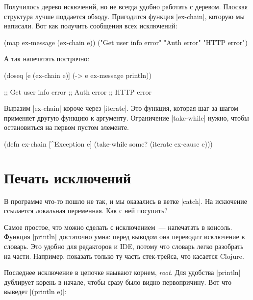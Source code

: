 Получилось дерево искючений, но не всегда удобно работать с деревом. Плоская
структура лучше поддается обходу. Пригодится функция \spverb|ex-chain|, которую
мы написали. Вот как получить сообщения всех исключений:

\begin{english}
  \begin{clojure}
(map ex-message (ex-chain e))
("Get user info error" "Auth error" "HTTP error")
  \end{clojure}
\end{english}

\noindent
А так напечатать построчно:

\begin{english}
  \begin{clojure}
(doseq [e (ex-chain e)]
  (-> e ex-message println))

;; Get user info error
;; Auth error
;; HTTP error
  \end{clojure}
\end{english}

Выразим \spverb|ex-chain| короче через \spverb|iterate|. Это функция, которая
шаг за шагом применяет другую функцию к аргументу. Ограничение
\spverb|take-while| нужно, чтобы остановиться на первом пустом элементе.

\begin{english}
  \begin{clojure}
(defn ex-chain [^Exception e]
  (take-while some? (iterate ex-cause e)))
  \end{clojure}
\end{english}

\section{Печать исключений}

В программе что-то пошло не так, и мы оказались в ветке \spverb|catch|. На
искючение ссылается локальная переменная. Как с ней посупить?

Самое простое, что можно сделать с исключением~--- напечатать в консоль. Функция
\spverb|println| достаточно умна: перед выводом она переводит исключение в
словарь. Это удобно для редакторов и IDE, потому что словарь легко разобрать на
части. Например, показать только ту часть стек-трейса, что касается Clojure.

Последнее исключение в цепочке наывают корнем, \emph{root}. Для удобства
\spverb|println| дублирует корень в начале, чтобы сразу было видно
первопричину. Вот что выведет \spverb|(println e)|:

